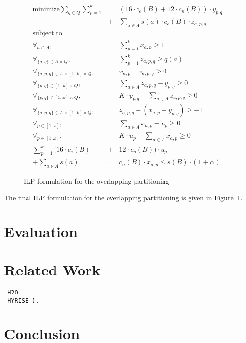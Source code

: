 \begin{figure}[!t]
\begin{mdframed}
\begin{eqnarray}
\text{minimize}  
    \sum_{q\in Q} \sum_{p=1}^{k} \!\!&&\!\! (16\cdot c_e(B) + 12\cdot c_n(B))\cdot y_{p,q}\nonumber\\
    &+& \sum_{a\in A} s(a)\cdot c_e(B)\cdot z_{a,p,q} \nonumber\\
\text{subject to}&&\nonumber\\
\forall_{a\in A}, 
    && \sum_{p=1}^{k} x_{a,p} \geq 1\nonumber\\
\forall_{\{a,q\}\in A\times Q},
    &&  \sum_{p=1}^{k} z_{a,p,q} \geq q(a) \nonumber\\
\forall_{\{a,p,q\}\in A\times [1..k]\times Q}, 
    && x_{a,p} - z_{a,p,q} \geq 0 \nonumber\\
\forall_{\{p,q\}\in [1..k]\times Q}, 
    &&  \sum_{a\in A} z_{a,p,q} - y_{p,q} \geq 0 \nonumber\\
\forall_{\{p,q\}\in [1..k]\times Q}, 
    &&  K\cdot y_{p,q} - \sum_{a\in A} z_{a,p,q}  \geq 0 \nonumber\\
\forall_{\{a,p,q\}\in A\times [1..k]\times Q}, 
    && z_{a,p,q} - (x_{a,p} + y_{p,q}) \geq -1 \nonumber\\
\forall_{p\in[1..k]},
    && \sum_{a\in A} x_{a,p} - u_p \geq 0 \nonumber\\
\forall_{p\in[1..k]},
    && K\cdot u_p - \sum_{a\in A} x_{a,p} \geq 0 \nonumber\\    
\sum_{p=1}^{k} (16\cdot c_e(B) &+& 12 \cdot c_n(B)) \cdot u_p  \nonumber \\ 
+ \sum_{a\in A} s(a) \!\!&\cdot&\!\! c_n(B)\cdot x_{a,p} \leq s(B)\cdot (1+\alpha)\nonumber
\end{eqnarray}
\end{mdframed}
\caption{ILP formulation for the overlapping partitioning}
\label{fig:ov-ilp}
\end{figure}

The final ILP formulation for the overlapping partitioning is given in
Figure~\ref{fig:ov-ilp}.


\section{Evaluation}
\section{Related Work}

\begin{alltt}\scriptsize
- H2O \cite{alagiannis14}
- HYRISE~\cite{grund10}).%
\end{alltt}
\section{Conclusion}


%



